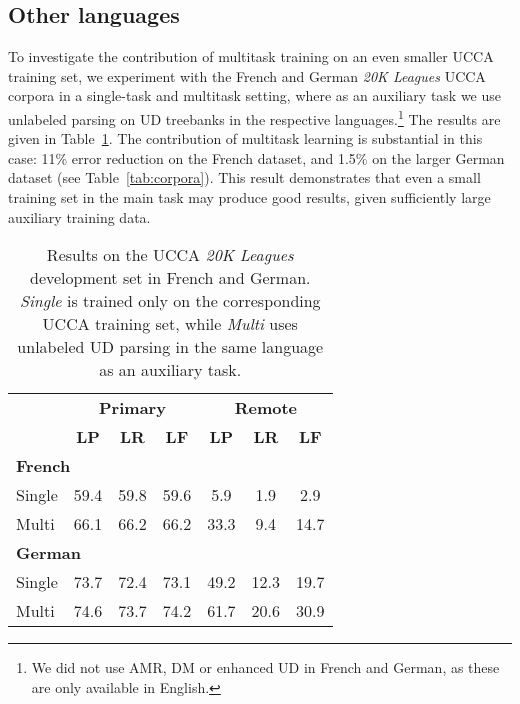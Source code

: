 \documentclass[11pt,a4paper]{article}
\begin{document}
\subsection{Other languages}\label{sec:multilingual}

To investigate the contribution of multitask training on an even smaller UCCA training set,
we experiment with the French and German \textit{20K Leagues} UCCA corpora
\cite{sulem2015conceptual}
in a single-task and multitask setting, where as an auxiliary task we use unlabeled parsing on
UD treebanks in the respective languages.\footnote{We did not use AMR, DM or enhanced UD in French
and German, as these are only available in English.}
The results are given in Table~\ref{tab:multilingual}.
The contribution of multitask learning is substantial in this case:
11\% error reduction on the French dataset, and 1.5\% on the larger German dataset
(see Table~\ref{tab:corpora}).
This result demonstrates that even a small training set in the main task may produce good results,
given sufficiently large auxiliary training data.

\begin{table}
\begin{tabular}{l|ccc|ccc}
& \multicolumn{3}{c|}{\footnotesize \bf Primary} & \multicolumn{3}{c}{\footnotesize \bf Remote} \\
& \footnotesize \textbf{LP} & \footnotesize \textbf{LR} & \footnotesize \textbf{LF}
& \footnotesize \textbf{LP} & \footnotesize \textbf{LR} & \footnotesize \textbf{LF} \\
\hline
\multicolumn{4}{l|}{\small \bf French} & \\
\small Single & 59.4 & 59.8 & 59.6 & 5.9 & 1.9 & 2.9 \\
\small Multi & 66.1 & 66.2 & 66.2 & 33.3 & 9.4 & 14.7 \\
\hline
\multicolumn{4}{l|}{\small \bf German} & \\
\small Single & 73.7 & 72.4 & 73.1 & 49.2 & 12.3 & 19.7 \\
\small Multi & 74.6 & 73.7 & 74.2 & 61.7 & 20.6 & 30.9
\end{tabular}
\caption{Results on the UCCA \textit{20K Leagues}
development set in French and German.
\textit{Single} is trained only on the corresponding UCCA training set,
while \textit{Multi} uses unlabeled UD parsing in the same language as an auxiliary task.
\label{tab:multilingual}}
\end{table}
\end{document}
